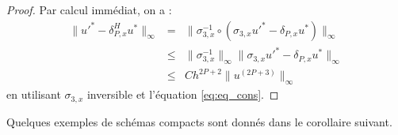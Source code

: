 \begin{proof}
Par calcul immédiat, on a :
\begin{equation}
\begin{array}{rcl}
\|  u'^* - \delta_{P,x}^H u^* \|_{\infty} &=& \| \sigma_{3,x}^{-1} \circ \left( \sigma_{3,x} u'^*  - \delta_{P,x}u^*\right) \|_{\infty}\\
                                      &\leq& \| \sigma_{3,x}^{-1} \|_{\infty} \| \sigma_{3,x} u'^*  - \delta_{P,x}u^*\|_{\infty}\\
                                      &\leq& C h^{2P+2}  \| u^{(2P+3)} \|_{\infty}
\end{array}
\end{equation}
en utilisant $\sigma_{3,x}$ inversible et l'équation \eqref{eq:eq_cons}.
\end{proof}
Quelques exemples de schémas compacts sont donnés dans le corollaire suivant.
